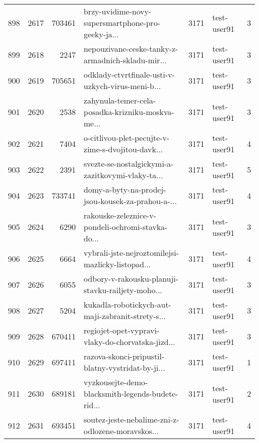 \begin{tabular}{lrrlrlr}
898  &       2617 &   703461 &  brzy-uvidime-novy-supersmartphone-pro-geeky-ja... &     3171 &                  test-user91 &               3 \\
899  &       2618 &     2247 &  nepouzivane-ceske-tanky-z-armadnich-skladu-mir... &     3171 &                  test-user91 &               3 \\
900  &       2619 &   705651 &  odklady-ctvrtfinale-usti-v-uzkych-virus-meni-b... &     3171 &                  test-user91 &               3 \\
901  &       2620 &     2538 &  zahynula-temer-cela-posadka-krizniku-moskva-me... &     3171 &                  test-user91 &               3 \\
902  &       2621 &     7404 &  o-citlivou-plet-pecujte-v-zime-s-dvojitou-davk... &     3171 &                  test-user91 &               4 \\
903  &       2622 &     2391 &  svezte-se-nostalgickymi-a-zazitkovymi-vlaky-ta... &     3171 &                  test-user91 &               5 \\
904  &       2623 &   733741 &  domy-a-byty-na-prodej-jsou-kousek-za-prahou-a-... &     3171 &                  test-user91 &               4 \\
905  &       2624 &     6290 &  rakouske-zeleznice-v-pondeli-ochromi-stavka-do... &     3171 &                  test-user91 &               3 \\
906  &       2625 &     6664 &  vybrali-jste-nejroztomilejsi-mazlicky-listopad... &     3171 &                  test-user91 &               4 \\
907  &       2626 &     6055 &  odbory-v-rakousku-planuji-stavku-railjety-moho... &     3171 &                  test-user91 &               3 \\
908  &       2627 &     5204 &  kukadla-robotickych-aut-maji-zabranit-strety-s... &     3171 &                  test-user91 &               3 \\
909  &       2628 &   670411 &  regiojet-opet-vypravi-vlaky-do-chorvatska-jizd... &     3171 &                  test-user91 &               3 \\
910  &       2629 &   697411 &  razova-skonci-pripustil-blatny-vystridat-by-ji... &     3171 &                  test-user91 &               1 \\
911  &       2630 &   689181 &  vyzkousejte-demo-blacksmith-legends-budete-rid... &     3171 &                  test-user91 &               2 \\
912  &       2631 &   693451 &  soutez-jeste-nebalime-zni-z-odlozene-moravskos... &     3171 &                  test-user91 &               4 \\

\end{tabular}
